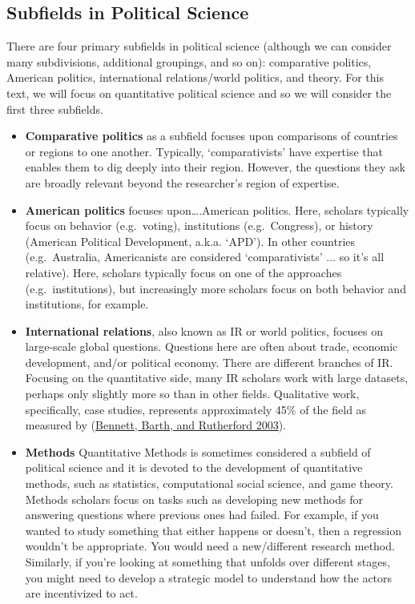 \documentclass{book}
\begin{document}
\hypertarget{subfields-in-political-science}{%
\subsection{Subfields in Political
Science}\label{subfields-in-political-science}}

There are four primary subfields in political science (although we can
consider many subdivisions, additional groupings, and so on): comparative
politics, American politics, international relations/world politics, and
theory. For this text, we will focus on quantitative political science and so
we will consider the first three subfields.

\begin{itemize}
\item
  \textbf{Comparative politics} as a subfield focuses upon comparisons of
  countries or regions to one another. Typically, `comparativists' have
  expertise that enables them to dig deeply into their region. However, the
  questions they ask are broadly relevant beyond the researcher's region of
  expertise.
\item
  \textbf{American politics} focuses upon\ldots.American politics. Here,
  scholars typically focus on behavior (e.g.~voting), institutions
  (e.g.~Congress), or history (American Political Development, a.k.a. `APD').
  In other countries (e.g.~Australia, Americanists are considered
  `comparativists' ... so it's all relative). Here, scholars typically focus
  on one of the approaches (e.g.~institutions), but increasingly more scholars
  focus on both behavior and institutions, for example.
\item
  \textbf{International relations}, also known as IR or world politics,
  focuses on large-scale global questions. Questions here are often about
  trade, economic development, and/or political economy. There are different
  branches of IR. Focusing on the quantitative side, many IR scholars work
  with large datasets, perhaps only slightly more so than in other fields.
  Qualitative work, specifically, case studies, represents approximately 45\%
  of the field as measured by
  (\protect\hyperlink{ref-bennettWePreachWhat2003}{Bennett, Barth, and
  Rutherford 2003}).
\item
  \textbf{Methods} Quantitative Methods is sometimes considered a subfield of
  political science and it is devoted to the development of quantitative
  methods, such as statistics, computational social science, and game theory.
  Methods scholars focus on tasks such as developing new methods for answering
  questions where previous ones had failed. For example, if you wanted to
  study something that either happens or doesn't, then a regression wouldn't
  be appropriate. You would need a new/different research method. Similarly,
  if you're looking at something that unfolds over different stages, you might
  need to develop a strategic model to understand how the actors are
  incentivized to act.
\end{itemize}
\end{document}

